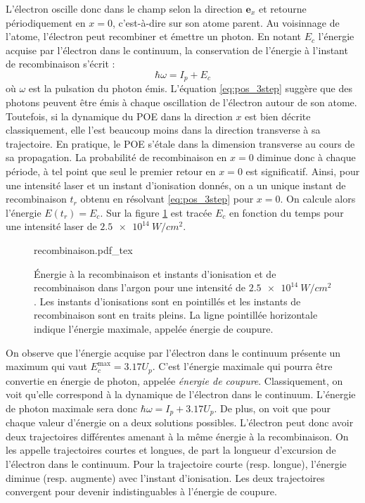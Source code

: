 L'électron oscille donc dans le champ selon la direction $\bm{e}_x$ et retourne périodiquement en $x=0$, c'est-à-dire sur son atome parent. Au voisinnage de l'atome, l'électron peut recombiner et émettre un photon. En notant $E_c$ l'énergie acquise par l'électron dans le continuum, la conservation de l'énergie à l'instant de recombinaison s'écrit :
\begin{equation}
\hbar\omega = I_p+E_c
\end{equation}
où $\omega$ est la pulsation du photon émis. L'équation \ref{eq:pos_3step} suggère que des photons peuvent être émis à chaque oscillation de l'électron autour de son atome. Toutefois, si la dynamique du POE dans la direction $x$ est bien décrite classiquement, elle l'est beaucoup moins dans la direction transverse à sa trajectoire. En pratique, le POE s'étale dans la dimension transverse au cours de sa propagation. La probabilité de recombinaison en $x=0$ diminue donc à chaque période, à tel point que seul le premier retour en $x=0$ est significatif. Ainsi, pour une intensité laser et un instant d'ionisation donnés, on a un unique instant de recombinaison $t_r$ obtenu en résolvant \ref{eq:pos_3step} pour $x=0$. On calcule alors l'énergie $E(t_r) = E_c$. Sur la figure \ref{fig:recombinaison} est tracée $E_c$ en fonction du temps pour une intensité laser de $\SI{2.5e14}{W/cm^2}$.

\begin{figure}[!ht]
\centering
\def\svgwidth{\columnwidth}
{recombinaison.pdf_tex}
\caption{\'Energie à la recombinaison et instants d'ionisation et de recombinaison dans l'argon pour une intensité de $\SI{2.5e14}{W/cm^2}$. Les instants d'ionisations sont en pointillés et les instants de recombinaison sont en traits pleins. La ligne pointillée horizontale indique l'énergie maximale, appelée énergie de coupure.}
\label{fig:recombinaison}
\end{figure}

On observe que l'énergie acquise par l'électron dans le continuum présente un maximum qui vaut $E_c^{\text{max}} = 3.17 U_p$. C'est l'énergie maximale qui pourra être convertie en énergie de photon, appelée \textit{énergie de coupure}. Classiquement, on voit qu'elle correspond à la dynamique de l'électron dans le continuum. L'énergie de photon maximale sera donc $\hbar\omega = I_p+3.17 U_p$. De plus, on voit que pour chaque valeur d'énergie on a deux solutions possibles. L'électron peut donc avoir deux trajectoires différentes amenant à la même énergie à la recombinaison. On les appelle trajectoires courtes et longues, de part la longueur d'excursion de l'électron dans le continuum. Pour la trajectoire courte (resp. longue), l'énergie diminue (resp. augmente) avec l'instant d'ionisation. Les deux trajectoires convergent pour devenir indistinguables à l'énergie de coupure.

